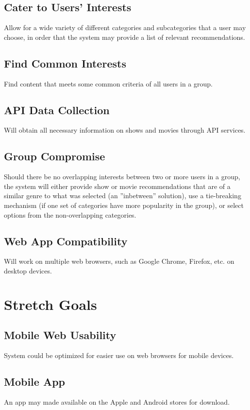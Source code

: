 \documentclass{article}
\begin{document}
\subsection{Cater to Users' Interests}
Allow for a wide variety of different categories and subcategories that a user may choose, in order that the system may provide a list of relevant recommendations.

\subsection{Find Common Interests}
Find content that meets some common criteria of all users in a group.

\subsection{API Data Collection}
Will obtain all necessary information on shows and movies through API services.

\subsection{Group Compromise}
Should there be no overlapping interests between two or more users in a group, the system will either provide show or movie recommendations that are of a similar 
genre to what was selected (an ”inbetween” solution), use a tie-breaking mechanism (if one set of categories have more popularity in the group), or select options 
from the non-overlapping categories.

\subsection{Web App Compatibility}
Will work on multiple web browsers, such as Google Chrome, Firefox, etc. on desktop devices.

\section{Stretch Goals}

\subsection{Mobile Web Usability}
System could be optimized for easier use on web browsers for mobile devices.

\subsection{Mobile App}
An app may made available on the Apple and Android stores for download.
\end{document}
